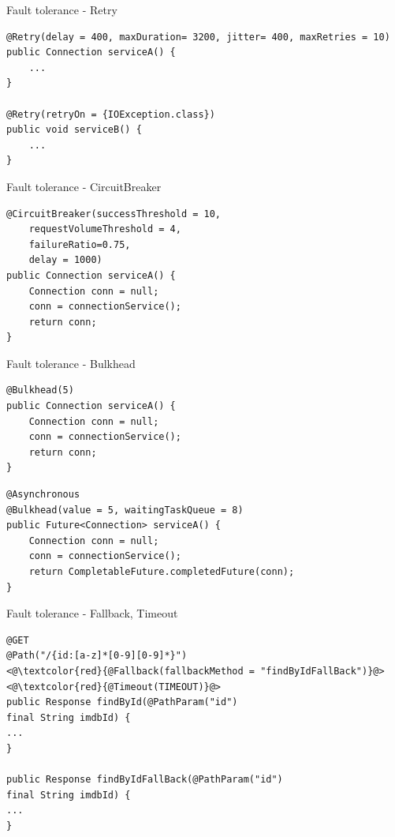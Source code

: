 \documentclass[aspectratio=169]{beamer}
\begin{document}
\begin{frame}[fragile]{Fault tolerance - Retry}
\begin{lstlisting}
@Retry(delay = 400, maxDuration= 3200, jitter= 400, maxRetries = 10)
public Connection serviceA() {
	...
}

@Retry(retryOn = {IOException.class})
public void serviceB() {
	...
}
\end{lstlisting}
\end{frame}

\begin{frame}[fragile]{Fault tolerance - CircuitBreaker}
\begin{lstlisting}
@CircuitBreaker(successThreshold = 10,
	requestVolumeThreshold = 4,
	failureRatio=0.75,
	delay = 1000)
public Connection serviceA() {
	Connection conn = null;
	conn = connectionService();
	return conn;
}
\end{lstlisting}
\end{frame}

\begin{frame}[fragile]{Fault tolerance - Bulkhead}
\begin{lstlisting}
@Bulkhead(5)
public Connection serviceA() {
	Connection conn = null;
	conn = connectionService();
	return conn;
}
\end{lstlisting}

\begin{lstlisting}
@Asynchronous
@Bulkhead(value = 5, waitingTaskQueue = 8)
public Future<Connection> serviceA() {
	Connection conn = null;
	conn = connectionService();
	return CompletableFuture.completedFuture(conn);
}

\end{lstlisting}
\end{frame}



\begin{frame}[fragile]{Fault tolerance - Fallback, Timeout}
\begin{lstlisting}
@GET
@Path("/{id:[a-z]*[0-9][0-9]*}")
<@\textcolor{red}{@Fallback(fallbackMethod = "findByIdFallBack")}@>
<@\textcolor{red}{@Timeout(TIMEOUT)}@>
public Response findById(@PathParam("id")
final String imdbId) {
...
}

public Response findByIdFallBack(@PathParam("id")
final String imdbId) {
...
}
\end{lstlisting}
\end{frame}
\end{document}
